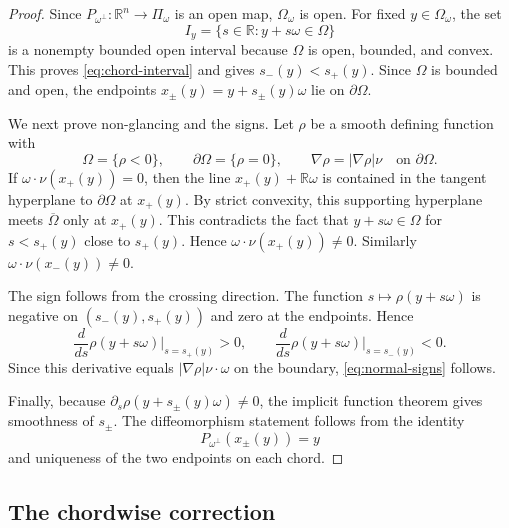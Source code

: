 \documentclass[11pt]{article}
\numberwithin{equation}{section}
\newcommand{\R}{\mathbb R}
\newcommand{\bd}{\partial}
\newcommand{\Om}{\Omega}
\begin{document}
\begin{proof}
Since \(P_{\omega^\perp}:\R^n\to\Pi_\omega\) is an open map, \(\Omega_\omega\) is open.  For fixed \(y\in\Omega_\omega\), the set
\[
    I_y=\{s\in\R:y+s\omega\in\Omega\}
\]
is a nonempty bounded open interval because \(\Omega\) is open, bounded, and convex.  This proves \eqref{eq:chord-interval} and gives \(s_-(y)<s_+(y)\).  Since \(\Omega\) is bounded and open, the endpoints \(x_\pm(y)=y+s_\pm(y)\omega\) lie on \(\bd\Om\).

We next prove non-glancing and the signs.  Let \(\rho\) be a smooth defining function with
\[
    \Omega=\{\rho<0\},
    \qquad
    \bd\Omega=\{\rho=0\},
    \qquad
    \nabla\rho=|\nabla\rho|\nu\quad\text{on }\bd\Omega .
\]
If \(\omega\cdot\nu(x_+(y))=0\), then the line \(x_+(y)+\R\omega\) is contained in the tangent hyperplane to \(\bd\Omega\) at \(x_+(y)\).  By strict convexity, this supporting hyperplane meets \(\overline\Omega\) only at \(x_+(y)\).  This contradicts the fact that \(y+s\omega\in\Omega\) for \(s<s_+(y)\) close to \(s_+(y)\).  Hence \(\omega\cdot\nu(x_+(y))\ne0\).  Similarly \(\omega\cdot\nu(x_-(y))\ne0\).

The sign follows from the crossing direction.  The function \(s\mapsto \rho(y+s\omega)\) is negative on \((s_-(y),s_+(y))\) and zero at the endpoints.  Hence
\[
    \frac{d}{ds}\rho(y+s\omega)\bigg|_{s=s_+(y)}>0,
    \qquad
    \frac{d}{ds}\rho(y+s\omega)\bigg|_{s=s_-(y)}<0.
\]
Since this derivative equals \(|\nabla\rho|\nu\cdot\omega\) on the boundary, \eqref{eq:normal-signs} follows.

Finally, because \(\partial_s\rho(y+s_\pm(y)\omega)\ne0\), the implicit function theorem gives smoothness of \(s_\pm\).  The diffeomorphism statement follows from the identity
\[
    P_{\omega^\perp}(x_\pm(y))=y
\]
and uniqueness of the two endpoints on each chord.
\end{proof}


\subsection{The chordwise correction}\label{subsec:chordwise-correction}
\end{document}
